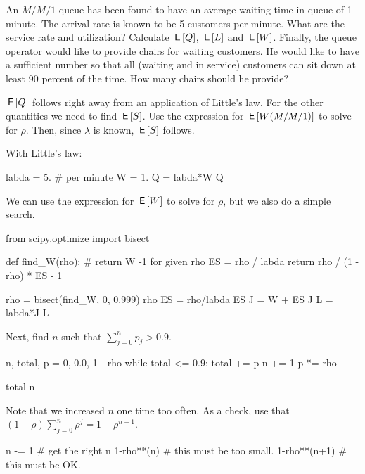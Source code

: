\begin{exercise}[Hall 5.6]
  An $M/M/1$ queue has been found to have an average waiting time in queue of 1 minute.
  The arrival rate is known to be 5 customers per minute.
  What are the service rate and utilization?
  Calculate $\,\mathsf{E}\left[Q\right]$, $\,\mathsf{E}\left[L\right]$ and $\,\mathsf{E}\left[W\right]$.
  Finally, the queue operator would like to provide chairs for waiting customers.
  He would like to have a sufficient number so that all (waiting and in service) customers can sit down at least 90 percent of the time.
  How many chairs should he provide?

\begin{hint}
  $\,\mathsf{E}\left[Q\right]$ follows right away from an application of Little's law.
  For the other quantities we need to find $\,\mathsf{E}\left[S\right]$.
  Use the expression for  $\,\mathsf{E}\left[W(M/M/1)\right]$ to solve for $\rho$. Then, since $\lambda$ is known, $\,\mathsf{E}\left[S\right]$ follows.
\end{hint}
\begin{solution} With Little's law:
\begin{pyconsole}
labda = 5. # per minute
W = 1.
Q = labda*W
Q
\end{pyconsole} 

We can use the expression for $\,\mathsf{E}\left[W\right]$ to solve for $\rho$, but we also do a simple search.
\begin{pyconsole}
from scipy.optimize import bisect


def find_W(rho): # return W -1 for given rho
    ES = rho / labda
    return rho / (1 - rho) * ES - 1


rho = bisect(find_W, 0, 0.999)
rho 
ES = rho/labda
ES
J = W + ES
J
L = labda*J
L
\end{pyconsole} 
Next, find $n$ such that $\sum_{j=0}^n p_j > 0.9$.
\begin{pyconsole} 
n, total, p = 0, 0.0, 1 - rho
while total <= 0.9:
    total += p
    n += 1
    p *= rho

total
n
\end{pyconsole} 
Note that we increased $n$ one time too often. As a check,  use that $(1-\rho) \sum_{j=0}^n \rho^j = 1-\rho^{n+1}$.
\begin{pyconsole}
n -= 1 # get the right n
1-rho**(n) # this must be too small.
1-rho**(n+1) # this must be OK.
\end{pyconsole} 
\end{solution}
\end{exercise}


